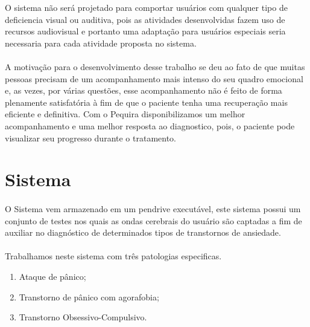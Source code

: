 \documentclass[12pt]{article}
\begin{document}
O sistema não será projetado para comportar usuários com qualquer tipo de deficiencia visual ou auditiva, pois as atividades desenvolvidas fazem uso de recursos audiovisual e portanto uma adaptação para usuários especiais seria necessaria para cada atividade proposta no sistema.

\paragraph{}A motivação para o desenvolvimento desse trabalho se deu ao fato de que muitas pessoas precisam de um acompanhamento mais intenso do seu quadro emocional e, as vezes, por várias questões, esse acompanhamento não é feito de forma plenamente satisfatória à fim de que o paciente tenha uma recuperação mais eficiente e definitiva. Com o Pequira disponibilizamos um melhor acompanhamento e uma melhor resposta ao diagnostico, pois, o paciente pode visualizar seu progresso durante o tratamento.


\section{Sistema}

\paragraph{}O Sistema vem armazenado em um pendrive executável, este sistema possui um conjunto de testes nos quais as ondas cerebrais do usuário são captadas a fim de auxiliar no diagnóstico de determinados tipos de transtornos de ansiedade.

\paragraph{}Trabalhamos neste sistema com três patologias especificas. 
\begin{enumerate}
\item Ataque de pânico;
\item Transtorno de pânico com agorafobia;
\item Transtorno Obsessivo-Compulsivo.
\end{enumerate}
\end{document}
